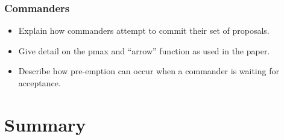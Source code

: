 \subsubsection{Commanders}
\begin{itemize}
  \item Explain how commanders attempt to commit their set of proposals.
  \item Give detail on the pmax and ``arrow'' function as used in the paper.
  \item Describe how pre-emption can occur when a commander is waiting for acceptance.
\end{itemize}

\section{Summary}
